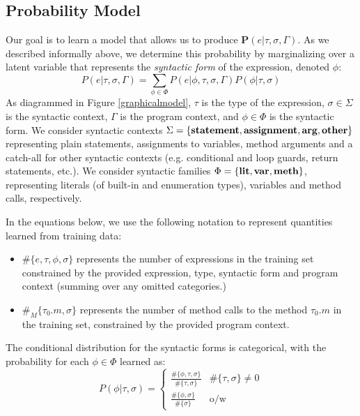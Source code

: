 \documentclass{article} %
\begin{document}
\newcommand{\nm}[1]{\#\{#1\}}
\newcommand{\nmm}[1]{\#_M\{#1\}}

\subsection*{Probability Model}
      Our goal is to learn a model that allows us to produce $\mathbf{P}(e|\tau, \sigma, \Gamma)$. As we described informally above, we determine this probability by marginalizing over a latent variable that represents the \emph{syntactic form} of the expression, denoted $\phi$:
    $$P(e | \tau, \sigma, \Gamma) = \sum_{\phi \in \Phi} P(e | \phi, \tau, \sigma, \Gamma) P(\phi | \tau, \sigma)$$
As diagrammed in Figure \ref{graphicalmodel}, $\tau$ is the type of the expression, $\sigma \in \Sigma$ is the syntactic context, $\Gamma$ is the program context, and $\phi \in \Phi$ is the syntactic form. We consider syntactic contexts $\Sigma = \{\textbf{statement}, \textbf{assignment}, \textbf{arg}, \textbf{other}\}$ representing plain statements, assignments to variables, method arguments and a catch-all for other syntactic contexts (e.g. conditional and loop guards, return statements, etc.). We consider syntactic families $\Phi = \{\textbf{lit}, \textbf{var}, \textbf{meth}\}$, representing literals (of built-in and enumeration types), variables and method calls, respectively. 

	  In the equations below, we use the following notation to represent quantities learned from training data:
	  \begin{itemize}
	  \item $\nm{e, \tau, \phi, \sigma}$ represents the number of expressions in the training set constrained by the provided expression, type, syntactic form and program context (summing over any omitted categories.)
	  \item $\nmm{\tau_0.m, \sigma}$ represents the number of method calls to the method $\tau_0.m$ in the training set, constrained by the provided program context.
  	  \end{itemize}
  
  The conditional distribution for the syntactic forms is categorical, with the probability for each $\phi \in \Phi$ learned as:
  $$P(\phi | \tau, \sigma) = 
  \left\{
  	\begin{array}{ll}
	 	\frac{\nm{\phi,\tau, \sigma}}{\nm{\tau, \sigma}} & \nm{\tau, \sigma} \neq 0\\
		\frac{\nm{\phi, \sigma}}{\nm{\sigma}} & \mbox{o/w}
	\end{array}
	\right.
  $$
  
\end{document}
